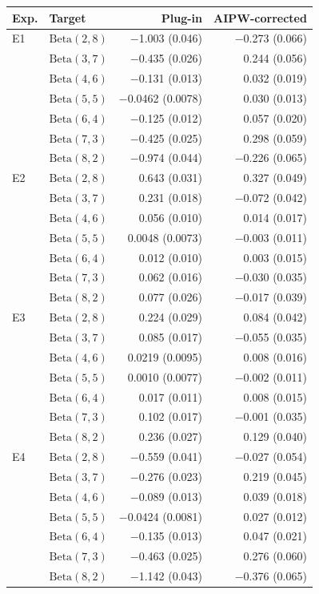 \begin{tabular}{llrr}
\hline
Exp. & Target & Plug-in & AIPW-corrected \\
\hline
E1 & $\mathrm{Beta}(2,8)$ & $-$1.003 (0.046) & $-$0.273 (0.066) \\
 & $\mathrm{Beta}(3,7)$ & $-$0.435 (0.026) & 0.244 (0.056) \\
 & $\mathrm{Beta}(4,6)$ & $-$0.131 (0.013) & 0.032 (0.019) \\
 & $\mathrm{Beta}(5,5)$ & $-$0.0462 (0.0078) & 0.030 (0.013) \\
 & $\mathrm{Beta}(6,4)$ & $-$0.125 (0.012) & 0.057 (0.020) \\
 & $\mathrm{Beta}(7,3)$ & $-$0.425 (0.025) & 0.298 (0.059) \\
 & $\mathrm{Beta}(8,2)$ & $-$0.974 (0.044) & $-$0.226 (0.065) \\[3pt]
E2 & $\mathrm{Beta}(2,8)$ & 0.643 (0.031) & 0.327 (0.049) \\
 & $\mathrm{Beta}(3,7)$ & 0.231 (0.018) & $-$0.072 (0.042) \\
 & $\mathrm{Beta}(4,6)$ & 0.056 (0.010) & 0.014 (0.017) \\
 & $\mathrm{Beta}(5,5)$ & 0.0048 (0.0073) & $-$0.003 (0.011) \\
 & $\mathrm{Beta}(6,4)$ & 0.012 (0.010) & 0.003 (0.015) \\
 & $\mathrm{Beta}(7,3)$ & 0.062 (0.016) & $-$0.030 (0.035) \\
 & $\mathrm{Beta}(8,2)$ & 0.077 (0.026) & $-$0.017 (0.039) \\[3pt]
E3 & $\mathrm{Beta}(2,8)$ & 0.224 (0.029) & 0.084 (0.042) \\
 & $\mathrm{Beta}(3,7)$ & 0.085 (0.017) & $-$0.055 (0.035) \\
 & $\mathrm{Beta}(4,6)$ & 0.0219 (0.0095) & 0.008 (0.016) \\
 & $\mathrm{Beta}(5,5)$ & 0.0010 (0.0077) & $-$0.002 (0.011) \\
 & $\mathrm{Beta}(6,4)$ & 0.017 (0.011) & 0.008 (0.015) \\
 & $\mathrm{Beta}(7,3)$ & 0.102 (0.017) & $-$0.001 (0.035) \\
 & $\mathrm{Beta}(8,2)$ & 0.236 (0.027) & 0.129 (0.040) \\[3pt]
E4 & $\mathrm{Beta}(2,8)$ & $-$0.559 (0.041) & $-$0.027 (0.054) \\
 & $\mathrm{Beta}(3,7)$ & $-$0.276 (0.023) & 0.219 (0.045) \\
 & $\mathrm{Beta}(4,6)$ & $-$0.089 (0.013) & 0.039 (0.018) \\
 & $\mathrm{Beta}(5,5)$ & $-$0.0424 (0.0081) & 0.027 (0.012) \\
 & $\mathrm{Beta}(6,4)$ & $-$0.135 (0.013) & 0.047 (0.021) \\
 & $\mathrm{Beta}(7,3)$ & $-$0.463 (0.025) & 0.276 (0.060) \\
 & $\mathrm{Beta}(8,2)$ & $-$1.142 (0.043) & $-$0.376 (0.065) \\
\hline
\end{tabular}
